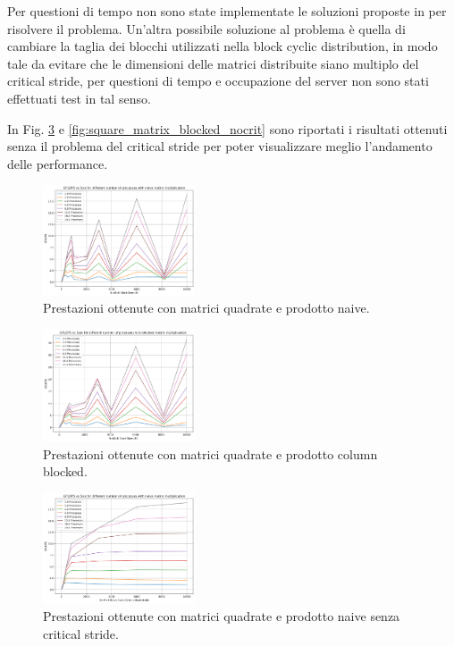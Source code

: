 \documentclass[conference]{IEEEtran}
\begin{document}
Per questioni di tempo non sono state implementate le soluzioni proposte in \cite{b1} per risolvere il problema. Un'altra possibile soluzione al problema è quella di cambiare la taglia dei blocchi utilizzati nella block cyclic distribution, in modo tale da evitare che le dimensioni delle matrici distribuite siano multiplo del critical stride, per questioni di tempo e occupazione del server non sono stati effettuati test in tal senso.

In Fig. \ref{fig:square_matrix_naive_nocrit} e \ref{fig:square_matrix_blocked_nocrit} sono riportati i risultati ottenuti senza il problema del critical stride per poter visualizzare meglio l'andamento delle performance.
\begin{figure}[H]
    \centering
    \includegraphics[width=0.4\textwidth]{resources/quadrate_naive.png}
    \caption{Prestazioni ottenute con matrici quadrate e prodotto naive.}
    \label{fig:square_matrix_naive}
\end{figure}
\begin{figure}[H]
    \centering
    \includegraphics[width=0.4\textwidth]{resources/quadrate_blocked.png}
    \caption{Prestazioni ottenute con matrici quadrate e prodotto column blocked.}
    \label{fig:square_matrix_blocked}
\end{figure}
\begin{figure}[H]
    \centering
    \includegraphics[width=0.4\textwidth]{resources/square_naive_nocrit.png}
    \caption{Prestazioni ottenute con matrici quadrate e prodotto naive senza critical stride.}
    \label{fig:square_matrix_naive_nocrit}
\end{figure}
\end{document}
